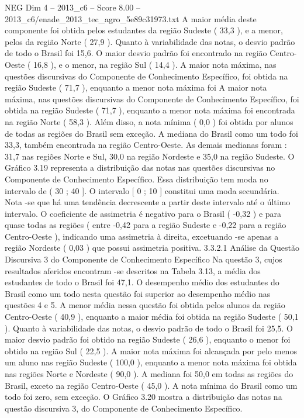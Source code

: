 \begin{textsample}{NEG Dim 4 – 2013\_c6 – Score 8.00 – 2013\_c6/enade\_2013\_tec\_agro\_5e89c31973.txt}
A maior média deste componente foi obtida pelos estudantes da região Sudeste ( 33,3 ), e a menor, pelos da região Norte ( 27,9 ).
Quanto à variabilidade das notas, o desvio padrão de todo o Brasil foi 15,6.
O maior desvio padrão foi encontrado na região Centro-Oeste ( 16,8 ), e o menor, na região Sul ( 14,4 ).
A maior nota máxima, nas questões discursivas do Componente de Conhecimento Específico, foi obtida na região Sudeste ( 71,7 ), enquanto a menor nota máxima foi A maior nota máxima, nas questões discursivas do Componente de Conhecimento Específico, foi obtida na região Sudeste ( 71,7 ), enquanto a menor nota máxima foi encontrada na região Norte ( 58,3 ).
Além disso, a nota mínima ( 0,0 ) foi obtida por alunos de todas as regiões do Brasil sem exceção.
A mediana do Brasil como um todo foi 33,3, também encontrada na região Centro-Oeste.
As demais medianas foram : 31,7 nas regiões Norte e Sul, 30,0 na região Nordeste e 35,0 na região Sudeste.
O Gráfico 3.19 representa a distribuição das notas nas questões discursivas no Componente de Conhecimento Específico.
Essa distribuição tem moda no intervalo de ( 30 ; 40 ].
O intervalo [ 0 ; 10 ] constitui uma moda secundária.
Nota -se que há uma tendência decrescente a partir deste intervalo até o último intervalo.
O coeficiente de assimetria é negativo para o Brasil ( -0,32 ) e para quase todas as regiões ( entre -0,42 para a região Sudeste e -0,22 para a região Centro-Oeste ), indicando uma assimetria à direita, excetuando -se apenas a região Nordeste ( 0,03 ) que possui assimetria positiva. 3.3.2.1 Análise da Questão Discursiva 3 do Componente de Conhecimento Específico Na questão 3, cujos resultados aferidos encontram -se descritos na Tabela 3.13, a média dos estudantes de todo o Brasil foi 47,1.
O desempenho médio dos estudantes do Brasil como um todo nesta questão foi superior ao desempenho médio nas questões 4 e 5.
A menor média nessa questão foi obtida pelos alunos da região Centro-Oeste ( 40,9 ), enquanto a maior média foi obtida na região Sudeste ( 50,1 ).
Quanto à variabilidade das notas, o desvio padrão de todo o Brasil foi 25,5.
O maior desvio padrão foi obtido na região Sudeste ( 26,6 ), enquanto o menor foi obtido na região Sul ( 22,5 ).
A maior nota máxima foi alcançada por pelo menos um aluno nas região Sudeste ( 100,0 ), enquanto a menor nota máxima foi obtida nas regiões Norte e Nordeste ( 90,0 ).
A mediana foi 50,0 em todas as regiões do Brasil, exceto na região Centro-Oeste ( 45,0 ).
A nota mínima do Brasil como um todo foi zero, sem exceção.
O Gráfico 3.20 mostra a distribuição das notas na questão discursiva 3, do Componente de Conhecimento Específico.

\end{textsample}
